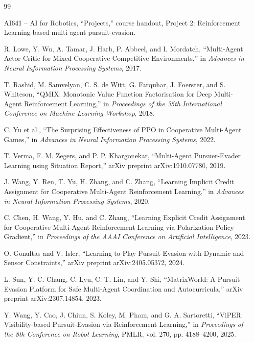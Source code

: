 \documentclass[conference]{IEEEtran}
\begin{document}

\begin{thebibliography}{99}

AI641 -- AI for Robotics, ``Projects,'' course handout, Project 2: Reinforcement Learning-based multi-agent pursuit-evasion.

R. Lowe, Y. Wu, A. Tamar, J. Harb, P. Abbeel, and I. Mordatch,
``Multi-Agent Actor-Critic for Mixed Cooperative-Competitive Environments,''
in \textit{Advances in Neural Information Processing Systems}, 2017.

T. Rashid, M. Samvelyan, C. S. de Witt, G. Farquhar, J. Foerster, and S. Whiteson,
``QMIX: Monotonic Value Function Factorisation for Deep Multi-Agent Reinforcement Learning,''
in \textit{Proceedings of the 35th International Conference on Machine Learning Workshop}, 2018.

C. Yu et al.,
``The Surprising Effectiveness of PPO in Cooperative Multi-Agent Games,''
in \textit{Advances in Neural Information Processing Systems}, 2022.

T. Verma, F. M. Zegers, and P. P. Khargonekar,
``Multi-Agent Pursuer-Evader Learning using Situation Report,''
arXiv preprint arXiv:1910.07780, 2019.

J. Wang, Y. Ren, T. Yu, H. Zhang, and C. Zhang,
``Learning Implicit Credit Assignment for Cooperative Multi-Agent Reinforcement Learning,''
in \textit{Advances in Neural Information Processing Systems}, 2020.

C. Chen, H. Wang, Y. Hu, and C. Zhang,
``Learning Explicit Credit Assignment for Cooperative Multi-Agent Reinforcement Learning via Polarization Policy Gradient,''
in \textit{Proceedings of the AAAI Conference on Artificial Intelligence}, 2023.

O. Gonultas and V. Isler,
``Learning to Play Pursuit-Evasion with Dynamic and Sensor Constraints,''
arXiv preprint arXiv:2405.05372, 2024.

L. Sun, Y.-C. Chang, C. Lyu, C.-T. Lin, and Y. Shi,
``MatrixWorld: A Pursuit-Evasion Platform for Safe Multi-Agent Coordination and Autocurricula,''
arXiv preprint arXiv:2307.14854, 2023.

Y. Wang, Y. Cao, J. Chiun, S. Koley, M. Pham, and G. A. Sartoretti,
``ViPER: Visibility-based Pursuit-Evasion via Reinforcement Learning,''
in \textit{Proceedings of the 8th Conference on Robot Learning}, PMLR, vol. 270, pp. 4188--4200, 2025.


\end{thebibliography}
\end{document}
